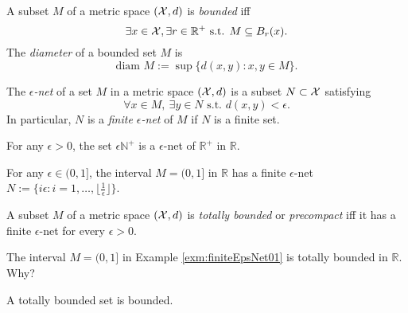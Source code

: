 \begin{defn}
  \label{def:Boundedness}
  A subset $M$ of a metric space $({\cal X},d)$
  is \emph{bounded} iff
  \begin{equation}
    \label{eq:bounded}
    \exists x\in{\cal X}, \exists r\in \mathbb{R}^+
    \text{ s.t. } M \subseteq B_r(x).
  \end{equation}
  The \emph{diameter} of a bounded set $M$ is
  \begin{equation}
    \label{eq:diameter}
    \text{diam } M := \sup\{d(x,y): x,y\in M\}.
  \end{equation}
\end{defn}

\begin{defn}
  \label{def:epsNet}
  The \emph{$\epsilon$-net} of a set $M$ in a metric space $({\cal X},d)$
  is a subset $N\subset {\cal X}$ satisfying
  \begin{equation}
    \label{eq:epsNet}
    \forall x\in M,\ \exists y\in N \text{ s.t. }
    d(x,y)<\epsilon. 
  \end{equation}
  In particular,
  $N$ is a \emph{finite $\epsilon$-net} of $M$
  if $N$ is a finite set.
\end{defn}

\begin{exm}
  For any $\epsilon>0$,
  the set $\epsilon\mathbb{N}^+$
  is a $\epsilon$-net of $\mathbb{R}^+$
  in $\mathbb{R}$.
\end{exm}

\begin{exm}
  \label{exm:finiteEpsNet01}
  For any $\epsilon\in(0,1]$,
  the interval $M=(0,1]$ in $\mathbb{R}$
  has a finite $\epsilon$-net 
  $N:=\{i\epsilon: i=1,\ldots,\lfloor\frac{1}{\epsilon}\rfloor\}$.
\end{exm}

\begin{defn}
  \label{def:totalBoundedness}
  A subset $M$ of a metric space $({\cal X},d)$
  is \emph{totally bounded} or \emph{precompact} iff
  it has a finite $\epsilon$-net
  for every $\epsilon>0$. 
\end{defn}

\begin{exm}
  The interval $M=(0,1]$ in Example
  \ref{exm:finiteEpsNet01} is totally bounded in $\mathbb{R}$.
  Why? 
\end{exm}


\begin{lem}
  \label{lem:totalBoundedImpliesBounded}
  A totally bounded set is bounded. 
\end{lem}


